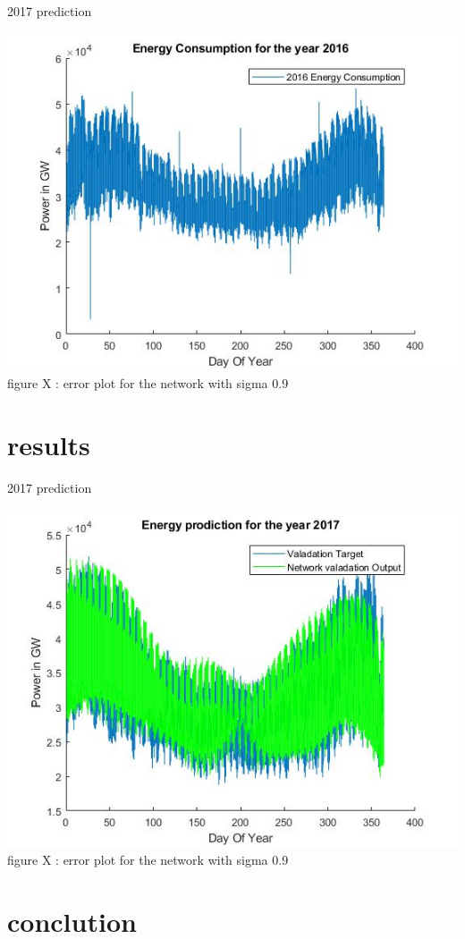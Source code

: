 \documentclass{IEEEtran}[11pt]
\begin{document}
\begin{flushleft}
  \vspace{1.5mm}
  \begin{center}
    2017 prediction
  \end{center}
  \vspace{1.5mm}
  \includegraphics[scale = 0.55]{2016datasetplotted}
  \vspace{1.5mm}
  {\footnotesize figure X : error plot for the network with sigma 0.9 }
  \\
  \vspace{1.5mm}

\end{flushleft}
\section{results}
\begin{flushleft}
  \vspace{1.5mm}
  \begin{center}
    2017 prediction
  \end{center}
  \vspace{1.5mm}
  \includegraphics[scale = 0.55]{2017prediction.jpg}
  \vspace{1.5mm}
  {\footnotesize figure X : error plot for the network with sigma 0.9 }
  \\
  \vspace{1.5mm}
\end{flushleft}

\section{conclution}
\end{document}
